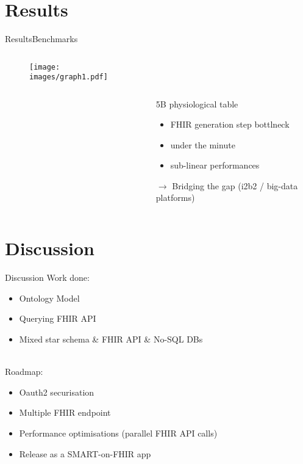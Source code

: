 \documentclass[10pt]{beamer}
\begin{document}
\section{Results}
\begin{frame}{Results}{Benchmarks}
 \begin{columns}[T,onlytextwidth]
        \begin{column}{.6\textwidth}
            \begin{onlyenv}
                \begin{minipage}{\textwidth}
                    \begin{figure}
\texttt{[image: images/graph1.pdf]}
                    \end{figure}
                \end{minipage}
            \end{onlyenv}
        \end{column}
        \begin{column}{.4\textwidth}
            \begin{onlyenv}
                \begin{minipage}{\textwidth}
			~\\
			~\\
			~\\
	5B physiological table
	\begin{itemize}
		\item FHIR generation step bottlneck
		\item under the minute
		\item sub-linear performances
	\end{itemize}
	$\rightarrow$ Bridging the gap (i2b2 / big-data platforms)
                \end{minipage}
            \end{onlyenv}
        \end{column}
    \end{columns} 

\end{frame}

\section{Discussion}
\begin{frame}{Discussion}{}
Work done:
\begin{itemize}
\item Ontology Model
\item Querying FHIR API
\item Mixed star schema \& FHIR API \& No-SQL DBs
\end{itemize}
~
	\\
	Roadmap:
\begin{itemize}
\item Oauth2 securisation
\item Multiple FHIR endpoint 
\item Performance optimisations (parallel FHIR API calls)
\item Release as a SMART-on-FHIR app 
\end{itemize}
\end{frame}
\end{document}
